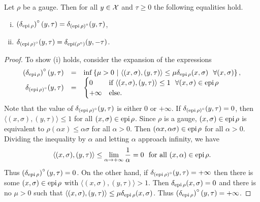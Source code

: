 \begin{prop}				\label{Prop:P-GD-indicator_epigraph_polar}
Let $\rho$ be a gauge.  Then for all $y \in {\mathcal X}$ and $\tau \geq 0$ the following equalities hold.
\begin{enumerate}[(i)]
\item
 $\left( \delta_{\textnormal{epi} \hspace{0.05cm} \rho} \right)^\circ(y, \tau) = \delta_{\left(  \textnormal{epi} \hspace{0.05cm} \rho \right)^\circ} (y, \tau)$,
\item
$\delta_{\left( \textnormal{epi} \hspace{0.05cm} \rho \right)^\circ} (y, \tau) = \delta_{\textnormal{epi} \left( \rho^\circ \right)}(y, -\tau)$.
\end{enumerate}
\end{prop}
\begin{proof}
To show (i) holds, consider the expansion of the expressions
\begin{equation*}
\begin{array}{rll}
\left( \delta_{\textnormal{epi} \halfspace \rho} \right)^\circ(y, \tau) 
	&	= 
			&	 \inf \left\{ \mu > 0 \ | \ \langle (x, \sigma), (y, \tau) \rangle \leq \mu \delta_{\epi \halfspace \rho}(x, \sigma) \ \ \forall (x, \sigma) \right\},
					\\
\delta_{\left( \epi \halfspace \rho \right)^\circ} (y, \tau) 
	&	= 
			&	\begin{cases}
						0 	&\textnormal{if } \langle (x, \sigma) , (y, \tau) \rangle \leq 1 \ \ \forall (x, \sigma) \in \epi \halfspace \rho \\
						+\infty	&\textnormal{else}.
				\end{cases}	
\end{array}
\end{equation*}
Note that the value of $\delta_{\left(  \textnormal{epi} \hspace{0.05cm} \rho \right)^\circ} (y, \tau)$ is either $0$ or $+\infty$.  If $\delta_{\left(  \textnormal{epi} \hspace{0.05cm} \rho \right)^\circ} (y, \tau) = 0$, then $\langle (x, \sigma), (y, \tau) \rangle  \leq 1$ for all $(x, \sigma) \in \textnormal{epi} \hspace{0.05cm} \rho$.  Since $\rho$ is a gauge, $(x, \sigma) \in \textnormal{epi} \hspace{0.05cm} \rho$ is equivalent to $\rho(\alpha x) \leq \alpha \sigma$ for all $\alpha > 0$.  Then $(\alpha x, \alpha \sigma) \in \textnormal{epi} \hspace{0.05cm} \rho$ for all $\alpha > 0$.  Dividing the inequality by $\alpha$ and letting $\alpha$ approach infinity, we have
\begin{equation*}
\langle (x, \sigma), (y, \tau) \rangle \leq \lim\limits_{\substack{\alpha \rightarrow +\infty}} \frac{1}{\alpha} = 0 \ \ \textnormal{for all} \ (x, \alpha) \in \epi \halfspace \rho.
\end{equation*}
Thus $\left( \delta_{\textnormal{epi} \hspace{0.05cm} \rho} \right)^\circ(y, \tau)  = 0$.  On the other hand, if $\delta_{\left(  \textnormal{epi} \hspace{0.05cm} \rho \right)^\circ} (y, \tau) = +\infty$ then there is some $(x, \sigma) \in \textnormal{epi} \hspace{0.05cm} \rho$ with $\langle (x, \sigma) , (y, \tau) \rangle > 1$.  Then $\delta_{\textnormal{epi} \hspace{0.05cm} \rho}(x, \sigma) = 0$ and there is no $\mu >0$ such that $\langle (x, \sigma), (y, \tau) \rangle \leq \mu \delta_{\textnormal{epi} \hspace{0.05cm} \rho}(x, \sigma)$.  Thus $\left( \delta_{\textnormal{epi} \hspace{0.05cm} \rho} \right)^\circ(y, \tau)  = +\infty$.


\end{proof}
